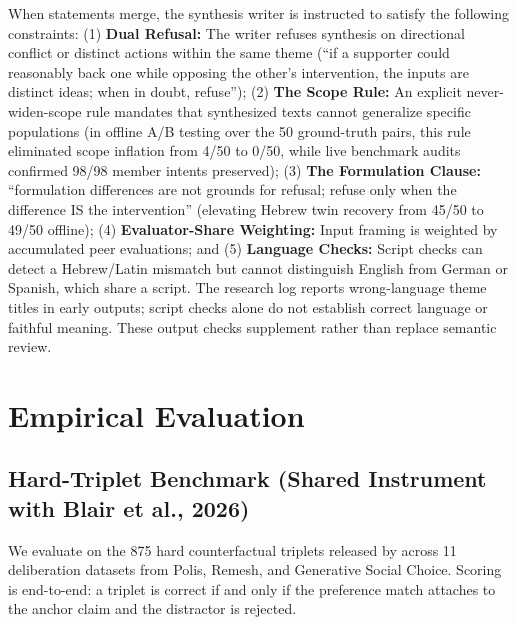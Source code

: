 \documentclass[11pt,a4paper]{article}
\begin{document}
When statements merge, the synthesis writer is instructed to satisfy the following constraints: (1) \textbf{Dual Refusal:} The writer refuses synthesis on directional conflict or distinct actions within the same theme (``if a supporter could reasonably back one while opposing the other's intervention, the inputs are distinct ideas; when in doubt, refuse''); (2) \textbf{The Scope Rule:} An explicit never-widen-scope rule mandates that synthesized texts cannot generalize specific populations (in offline A/B testing over the 50 ground-truth pairs, this rule eliminated scope inflation from 4/50 to 0/50, while live benchmark audits confirmed 98/98 member intents preserved); (3) \textbf{The Formulation Clause:} ``formulation differences are not grounds for refusal; refuse only when the difference IS the intervention'' (elevating Hebrew twin recovery from 45/50 to 49/50 offline); (4) \textbf{Evaluator-Share Weighting:} Input framing is weighted by accumulated peer evaluations; and (5) \textbf{Language Checks:} Script checks can detect a Hebrew/Latin mismatch but cannot distinguish English from German or Spanish, which share a script. The research log reports wrong-language theme titles in early outputs; script checks alone do not establish correct language or faithful meaning. These output checks supplement rather than replace semantic review.

\section{Empirical Evaluation}

\subsection{Hard-Triplet Benchmark (Shared Instrument with Blair et al., 2026)}
\label{sec:triplets}

We evaluate on the 875 hard counterfactual triplets released by \citet{blair2026embeddings} across 11 deliberation datasets from Polis, Remesh, and Generative Social Choice. Scoring is end-to-end: a triplet is correct if and only if the preference match attaches to the anchor claim and the distractor is rejected.
\end{document}
